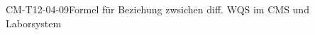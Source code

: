 
\begin{CONC}{CM-T12-04-09}{Formel für Beziehung zwsichen diff. WQS im CMS und Laborsystem}
\end{CONC}
